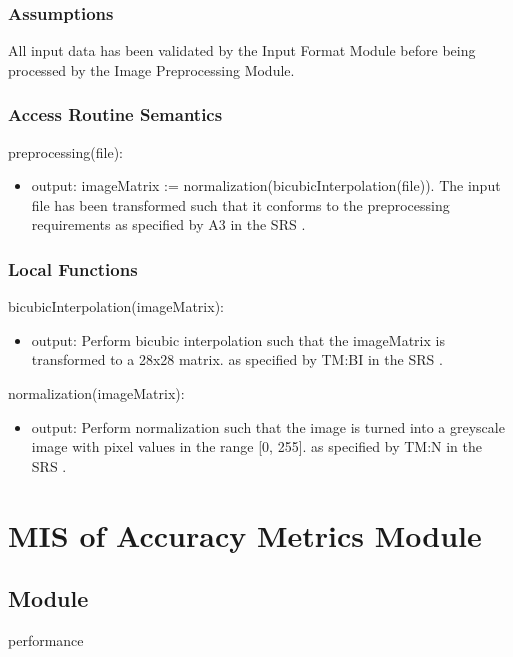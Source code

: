 \documentclass[12pt, titlepage]{article}
\begin{document}
\subsubsection{Assumptions}

All input data has been validated by the Input Format Module before being
processed by the Image Preprocessing Module.

\subsubsection{Access Routine Semantics}

\noindent preprocessing(file):
\begin{itemize} 
\item output: imageMatrix := normalization(bicubicInterpolation(file)). The
input file has been transformed such that it conforms to the preprocessing
requirements as specified by A3 in the SRS \cite[4.2.1]{SRS}.
\end{itemize}

\subsubsection{Local Functions}

\noindent bicubicInterpolation(imageMatrix):
\begin{itemize}
\item output: Perform bicubic interpolation such that the imageMatrix is
transformed to a 28x28 matrix. as specified by TM:BI in the SRS \cite[4.2.2]{SRS}.
\end{itemize}
\noindent normalization(imageMatrix):
\begin{itemize}
\item output: Perform normalization such that the image is turned into a
greyscale image with pixel values in the range [0, 255]. as specified by TM:N in
the SRS \cite[4.2.2]{SRS}.
\end{itemize}

\newpage
\section{MIS of Accuracy Metrics Module} \label{mAccuracy}

\subsection{Module}

performance
\end{document}
